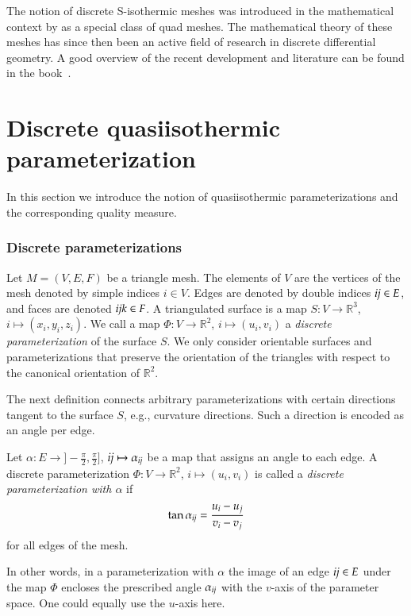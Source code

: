 \documentclass[Thesis.tex]{subfiles}
\begin{document}
The notion of discrete S-isothermic meshes was introduced in the mathematical
context by \cite{BobenkoP1996} as a special class of quad meshes.
The mathematical theory of these meshes has since then been an active field of
research in discrete differential geometry. A good overview of the recent
development and literature can be found in the book~\cite{BobenkoSuris2008}. 


\section{Discrete quasiisothermic parameterization}
\label{sec:parametrization}
In this section we introduce the notion of quasiisothermic parameterizations and the
corresponding quality measure.

\subsubsection{Discrete parameterizations}
Let $M=(V,E,F)$ be a triangle mesh. The elements of $V$ are the vertices of the
mesh denoted by simple indices $i\in V$. Edges are denoted by double
indices $\mathrm{\it{ij}}\in E$, and faces are denoted $\mathrm{\it{ijk}}\in F$. A triangulated surface is
a map $S:V\to \mathbb R^3$, $i \mapsto (x_i, y_i, z_i)$.
We call a map $\Phi: V \to \mathbb R^2$, $i \mapsto (u_i,v_i)$ a \emph{discrete
parameterization} of the surface $S$. We only consider orientable surfaces and
parameterizations that preserve the orientation of the triangles with respect to
the canonical orientation of $\mathbb R^2$. 

The next definition connects arbitrary parameterizations with certain directions
tangent to the surface $S$, e.g., curvature directions. Such a direction is encoded as 
an angle per edge. 
\begin{definition}
Let $\alpha : E \to ]-\frac{\pi}{2},\frac{\pi}{2}]$, $\mathrm{\it{ij}} \mapsto \alpha_{\mathrm{\it{ij}}}$
be a map that assigns an angle to each edge. A discrete parameterization 
$\Phi: V\to \mathbb R^2$, $i \mapsto (u_i,v_i)$ is called a \emph{discrete
parameterization with $\alpha$} if
\begin{equation}
\label{eq:isothermic}
\tan \alpha_{\mathrm{\it{ij}}} = \frac{u_i - u_j}{v_i - v_j}
\end{equation}
for all edges of the mesh.
\end{definition}
In other words, in a parameterization with $\alpha$ the image of an edge $\mathrm{\it{ij}}\in
E$ under the map $\Phi$ encloses the prescribed angle $\alpha_{\mathrm{\it{ij}}}$ with the
$v$-axis of the parameter space. One could equally use the $u$-axis here.
\end{document}
